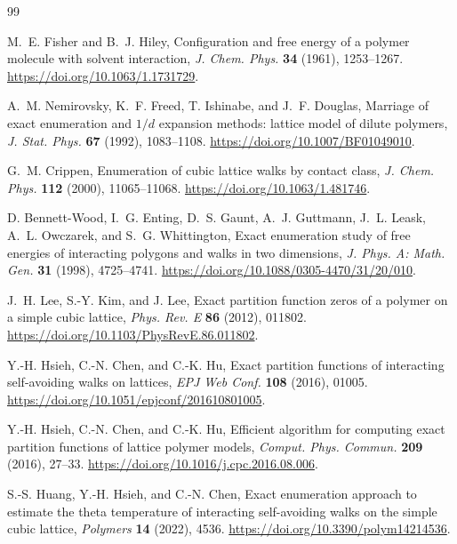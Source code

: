 \documentclass[11pt]{article}
\theoremstyle{definition}
\theoremstyle{remark}
\begin{document}
\clearpage
\begin{thebibliography}{99}
\sloppy
\raggedright

M.~E. Fisher and B.~J. Hiley,
\newblock Configuration and free energy of a polymer molecule with solvent
interaction,
\newblock \emph{J. Chem. Phys.} \textbf{34} (1961), 1253--1267.
\url{https://doi.org/10.1063/1.1731729}.

A.~M. Nemirovsky, K.~F. Freed, T. Ishinabe, and J.~F. Douglas,
\newblock Marriage of exact enumeration and $1/d$ expansion methods: lattice
model of dilute polymers,
\newblock \emph{J. Stat. Phys.} \textbf{67} (1992), 1083--1108.
\url{https://doi.org/10.1007/BF01049010}.

G.~M. Crippen,
\newblock Enumeration of cubic lattice walks by contact class,
\newblock \emph{J. Chem. Phys.} \textbf{112} (2000), 11065--11068.
\url{https://doi.org/10.1063/1.481746}.

D. Bennett-Wood, I.~G. Enting, D.~S. Gaunt, A.~J. Guttmann, J.~L. Leask,
A.~L. Owczarek, and S.~G. Whittington,
\newblock Exact enumeration study of free energies of interacting polygons and
walks in two dimensions,
\newblock \emph{J. Phys. A: Math. Gen.} \textbf{31} (1998), 4725--4741.
\url{https://doi.org/10.1088/0305-4470/31/20/010}.

J.~H. Lee, S.-Y. Kim, and J. Lee,
\newblock Exact partition function zeros of a polymer on a simple cubic
lattice,
\newblock \emph{Phys. Rev. E} \textbf{86} (2012), 011802.
\url{https://doi.org/10.1103/PhysRevE.86.011802}.

Y.-H. Hsieh, C.-N. Chen, and C.-K. Hu,
\newblock Exact partition functions of interacting self-avoiding walks on
lattices,
\newblock \emph{EPJ Web Conf.} \textbf{108} (2016), 01005.
\url{https://doi.org/10.1051/epjconf/201610801005}.

Y.-H. Hsieh, C.-N. Chen, and C.-K. Hu,
\newblock Efficient algorithm for computing exact partition functions of
lattice polymer models,
\newblock \emph{Comput. Phys. Commun.} \textbf{209} (2016), 27--33.
\url{https://doi.org/10.1016/j.cpc.2016.08.006}.

S.-S. Huang, Y.-H. Hsieh, and C.-N. Chen,
\newblock Exact enumeration approach to estimate the theta temperature of
interacting self-avoiding walks on the simple cubic lattice,
\newblock \emph{Polymers} \textbf{14} (2022), 4536.
\url{https://doi.org/10.3390/polym14214536}.


\end{thebibliography}
\end{document}
